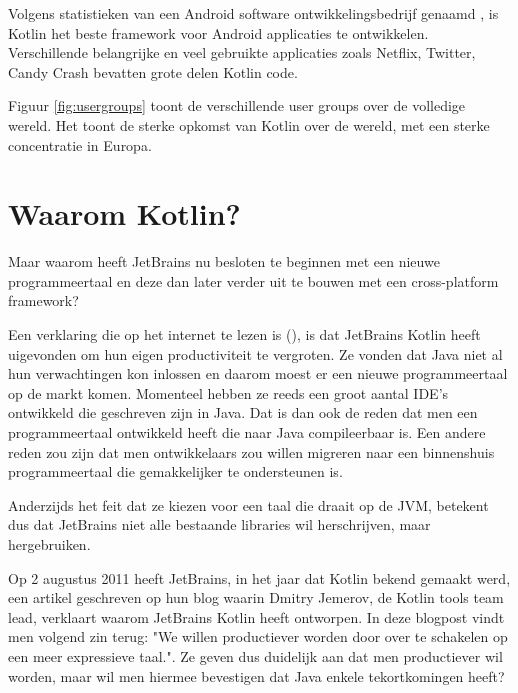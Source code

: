 Volgens statistieken van een Android software ontwikkelingsbedrijf genaamd \textcite{AppBrain}, is Kotlin het beste framework voor Android applicaties te ontwikkelen. Verschillende belangrijke en veel gebruikte applicaties zoals Netflix, Twitter, Candy Crash bevatten grote delen Kotlin code.

Figuur \ref{fig:usergroups} toont de verschillende user groups over de volledige wereld. Het toont de sterke opkomst van Kotlin over de wereld, met een sterke concentratie in Europa.

\section{Waarom Kotlin?}
\label{sec:whykotlin}
Maar waarom heeft JetBrains nu besloten te beginnen met een nieuwe programmeertaal en deze dan later verder uit te bouwen met een cross-platform framework?

Een verklaring die op het internet te lezen is (\cite{TechYourChance}), is dat JetBrains Kotlin heeft uigevonden om hun eigen productiviteit te vergroten. Ze vonden dat Java niet al hun verwachtingen kon inlossen en daarom moest er een nieuwe programmeertaal op de markt komen. Momenteel hebben ze reeds een groot aantal IDE's ontwikkeld die geschreven zijn in Java. Dat is dan ook de reden dat men een programmeertaal ontwikkeld heeft die naar Java compileerbaar is. Een andere reden zou zijn dat men ontwikkelaars zou willen migreren naar een binnenshuis programmeertaal die gemakkelijker te ondersteunen is.

Anderzijds het feit dat ze kiezen voor een taal die draait op de JVM, betekent dus dat JetBrains niet alle bestaande libraries wil herschrijven, maar hergebruiken.

Op 2 augustus 2011 heeft JetBrains, in het jaar dat Kotlin bekend gemaakt werd, een artikel geschreven op hun blog \textcite{JetBrainsNeedKotlin} waarin Dmitry Jemerov, de Kotlin tools team lead, verklaart waarom JetBrains Kotlin heeft ontworpen. In deze blogpost vindt men volgend zin terug: "We willen productiever worden door over te schakelen op een meer expressieve taal.". Ze geven dus duidelijk aan dat men productiever wil worden, maar wil men hiermee bevestigen dat Java enkele tekortkomingen heeft?


